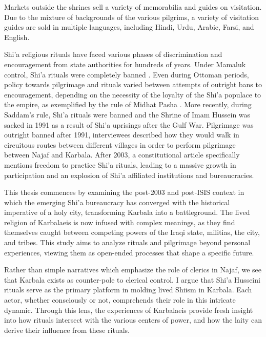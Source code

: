 Markets outside the shrines sell a variety of memorabilia and guides on visitation. Due to the mixture of backgrounds of the various pilgrims, a variety of visitation guides are sold in multiple languages, including Hindi, Urdu, Arabic, Farsi, and English. 

Shi'a religious rituals have faced various phases of discrimination and encouragement from state authorities for hundreds of years. Under Mamaluk control, Shi'a rituals were completely banned \cite{yitzhak_nakash_attempt_1993}. Even during Ottoman periods, policy towards pilgrimage and rituals varied between attempts of outright bans to encouragement, depending on the necessity of the loyalty of the Shi'a populace to the empire, as exemplified by the rule of Midhat Pasha \cite{aghaie_martyrs_2004}. More recently, during Saddam's rule, Shi'a rituals were banned and the Shrine of Imam Hussein was sacked in 1991 as a result of Shi'a uprisings after the Gulf War. Pilgrimage was outright banned after 1991, interviewees described how they would walk in circuitous routes between different villages in order to perform pilgrimage between Najaf and Karbala. After 2003, a constitutional article specifically mentions freedom to practice Shi'a rituals, leading to a massive growth in participation and an explosion of Shi'a affiliated institutions and bureaucracies. 

This thesis commences by examining the post-2003 and post-ISIS context in which the emerging Shi'a bureaucracy has converged with the historical imperative of a holy city, transforming Karbala into a battleground. The lived religion of Karbalaeis is now infused with complex meanings, as they find themselves caught between competing powers of the Iraqi state, militias, the city, and tribes. This study aims to analyze rituals and pilgrimage beyond personal experiences, viewing them as open-ended processes that shape a specific future.

Rather than simple narratives which emphasize the role of clerics in Najaf, we see that Karbala exists as counter-pole to clerical control. I argue that Shi'a Husseini rituals serve as the primary platform in molding lived Shiism in Karbala.  Each actor, whether consciously or not, comprehends their role in this intricate dynamic. Through this lens, the experiences of Karbalaeis provide fresh insight into how rituals intersect with the various centers of power, and how the laity can derive their influence from these rituals. 